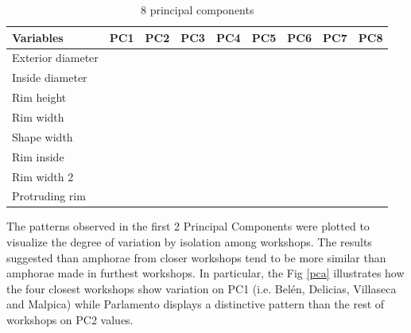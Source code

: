 \documentclass[review]{elsarticle}
\begin{document}
\begin{table}[htp]
\begin{tabular}{lcccccccc}
\hline
 Variables		&        PC1 & PC2	& PC3 & PC4 & PC5 & PC6 & PC7 & PC8     \\ \hline
 Exterior diameter	& 		 &		&	  &  	&	  &	    &     &           \\
 Inside diameter  	& 		 &		&	  &   	&	  &	    &     &           \\
 Rim height          &        &      &     &     &     &     &     &           \\
 Rim width        	&		 &		&	  &  	&	  &		&	  &          \\
 Shape width         &		 &		&	  &  	&	  &		&     &          \\
 Rim inside          &		 &	    &	  &     &	  &		&	  &          \\                                    
 Rim width 2		     & 	     &	    &	  & 		&	  &		&	  &          \\	
 Protruding rim		&        &      &      &     &     &     &     &          \\
\hline
\end{tabular}
\caption{8 principal components}
\label{table:variable}
\end{table}


The patterns observed in the first 2 Principal Components were plotted to visualize the degree of variation by isolation among workshops. The results suggested than amphorae from closer workshops tend to be more similar than amphorae made in furthest workshops. In particular, the Fig \ref{pca} illustrates how the four closest workshops show variation on PC1 (i.e. Bel\'en, Delicias, Villaseca and Malpica) while Parlamento displays a distinctive pattern than the rest of workshops on PC2 values. 
\end{document}
